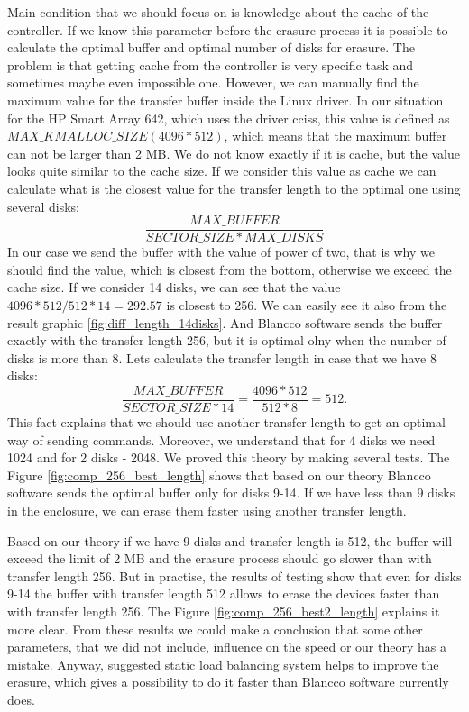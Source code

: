 Main condition that we should focus on is knowledge about the cache of the controller. If we know this parameter before the erasure process it is possible to calculate the optimal buffer and optimal number of disks for erasure. The problem is that getting cache from the controller is very specific task and sometimes maybe even impossible one. However, we can manually find the maximum value for the transfer buffer inside the Linux driver. In our situation for the HP Smart Array 642, which uses the driver cciss, this value is defined as $MAX\_KMALLOC\_SIZE (4096*512)$, which means that the maximum buffer can not be larger than 2 MB. We do not know exactly if it is cache, but the value looks quite similar to the cache size. If we consider this value as cache we can calculate what is the closest value for the transfer length to the optimal one using several disks:
\begin{equation}
	\frac{MAX\_BUFFER}{SECTOR\_SIZE*MAX\_DISKS} 
\end{equation}
In our case we send the buffer with the value of power of two, that is why we should find the value, which is closest from the bottom, otherwise we exceed the cache size. If we consider 14 disks, we can see that the value $4096*512/512*14=292.57$ is closest to 256. We can easily see it also from the result graphic \ref{fig:diff_length_14disks}. And Blancco software sends the buffer exactly with the transfer length 256, but it is optimal olny when the number of disks is more than 8. Lets calculate the transfer length in case that we have 8 disks:
\begin{equation}
	\frac{MAX\_BUFFER}{SECTOR\_SIZE*14} = \frac{4096*512}{512*8} = 512.
\end{equation}
This fact explains that we should use another transfer length to get an optimal way of sending commands. Moreover, we understand that for 4 disks we need 1024 and for 2 disks - 2048. We proved this theory by making several tests. The Figure \ref{fig:comp_256_best_length} shows that based on our theory Blancco software sends the optimal buffer only for disks 9-14. If we have less than 9 disks in the enclosure, we can erase them faster using another transfer length.

Based on our theory if we have 9 disks and transfer length is 512, the buffer will exceed the limit of 2 MB and the erasure process should go slower than with transfer length 256. But in practise, the results of testing show that even for disks 9-14 the buffer with transfer length 512 allows to erase the devices faster than with transfer length 256. The Figure \ref{fig:comp_256_best2_length} explains it more clear. From these results we could make a conclusion that some other parameters, that we did not include, influence on the speed or our theory has a mistake. Anyway, suggested static load balancing system helps to improve the erasure, which gives a possibility to do it faster than Blancco software currently does.

